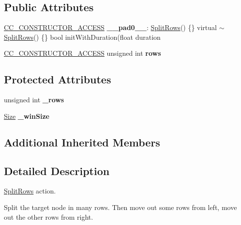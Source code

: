 \subsection*{Public Attributes}
\begin{DoxyCompactItemize}
\item 
\mbox{\label{classSplitRows_ac5f7bd37b678a6961b42b871b310ae6b}} 
\hyperlink{_2cocos2d_2cocos_2base_2ccConfig_8h_a25ef1314f97c35a2ed3d029b0ead6da0}{C\+C\+\_\+\+C\+O\+N\+S\+T\+R\+U\+C\+T\+O\+R\+\_\+\+A\+C\+C\+E\+SS} {\bfseries \+\_\+\+\_\+pad0\+\_\+\+\_\+}\+: \hyperlink{classSplitRows}{Split\+Rows}() \{\} virtual $\sim$\hyperlink{classSplitRows}{Split\+Rows}() \{\} bool init\+With\+Duration(float duration
\item 
\mbox{\label{classSplitRows_a613424e32b638f962a0f07582df2d87d}} 
\hyperlink{_2cocos2d_2cocos_2base_2ccConfig_8h_a25ef1314f97c35a2ed3d029b0ead6da0}{C\+C\+\_\+\+C\+O\+N\+S\+T\+R\+U\+C\+T\+O\+R\+\_\+\+A\+C\+C\+E\+SS} unsigned int {\bfseries rows}
\end{DoxyCompactItemize}
\subsection*{Protected Attributes}
\begin{DoxyCompactItemize}
\item 
\mbox{\label{classSplitRows_a2f05caaf5072a2bc287b54fa9552f1c9}} 
unsigned int {\bfseries \+\_\+rows}
\item 
\mbox{\label{classSplitRows_a5d015086dab87cf85cc6160fd9f2b632}} 
\hyperlink{classSize}{Size} {\bfseries \+\_\+win\+Size}
\end{DoxyCompactItemize}
\subsection*{Additional Inherited Members}


\subsection{Detailed Description}
\hyperlink{classSplitRows}{Split\+Rows} action. 

Split the target node in many rows. Then move out some rows from left, move out the other rows from right. 

